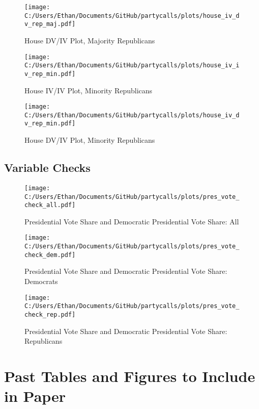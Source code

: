 \documentclass[12pt]{article}
\begin{document}
\begin{figure}[H]
	\centering
	\caption{House DV/IV Plot, Majority Republicans}
	\texttt{[image: C:/Users/Ethan/Documents/GitHub/partycalls/plots/house\_iv\_dv\_rep\_maj.pdf]}
\end{figure}

\begin{figure}[H]
	\centering
	\caption{House IV/IV Plot, Minority Republicans}
	\texttt{[image: C:/Users/Ethan/Documents/GitHub/partycalls/plots/house\_iv\_iv\_rep\_min.pdf]}
\end{figure}


\begin{figure}[H]
	\centering
	\caption{House DV/IV Plot, Minority Republicans}
	\texttt{[image: C:/Users/Ethan/Documents/GitHub/partycalls/plots/house\_iv\_dv\_rep\_min.pdf]}
\end{figure}



\clearpage

\subsection{Variable Checks}

\begin{figure}[H]
\centering
\caption{Presidential Vote Share and Democratic Presidential Vote Share: All}
\texttt{[image: C:/Users/Ethan/Documents/GitHub/partycalls/plots/pres\_vote\_check\_all.pdf]}
\end{figure}

\begin{figure}[H]
	\centering
	\caption{Presidential Vote Share and Democratic Presidential Vote Share: Democrats}
	\texttt{[image: C:/Users/Ethan/Documents/GitHub/partycalls/plots/pres\_vote\_check\_dem.pdf]}
\end{figure}

\begin{figure}[H]
	\centering
	\caption{Presidential Vote Share and Democratic Presidential Vote Share: Republicans}
	\texttt{[image: C:/Users/Ethan/Documents/GitHub/partycalls/plots/pres\_vote\_check\_rep.pdf]}
\end{figure}

\clearpage

\section{Past Tables and Figures to Include in Paper}
\end{document}
